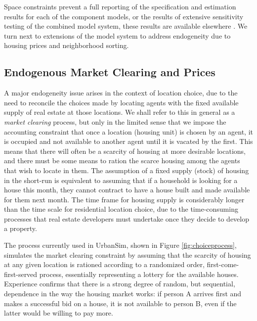 \documentclass[12pt,a4paper]{article}
\begin{document}
Space constraints prevent a full reporting of the specification and
estimation results for each of the component models, or the results
of extensive sensitivity testing of the combined model system, these
results are available elsewhere \cite{waddell-cuspa-2004}.  We turn
next to extensions of the model system to address endogeneity due to 
housing prices and neighborhood sorting.


\subsection{Endogenous Market Clearing and Prices}

A major endogeneity issue arises in the context of location
choice, due to the need to reconcile the choices made by locating
agents with the fixed available supply of real estate at those
locations. We shall refer to this in general as a \emph{market
clearing} process, but only in the limited sense that we impose
the accounting constraint that once a location (housing unit) is
chosen by an agent, it is occupied and not available to another
agent until it is vacated by the first.  This means that there
will often be a scarcity of housing at more desirable locations,
and there must be some means to ration the scarce housing among
the agents that wish to locate in them. The assumption of a fixed
supply (stock) of housing in the short-run is equivalent to
assuming that if a household is looking for a house this month,
they cannot contract to have a house built and made available for
them next month.  The time frame for housing supply is
considerably longer than the time scale for residential location
choice, due to the time-consuming processes that real estate
developers must undertake once they decide to develop a property.

The process currently used in UrbanSim, shown in Figure
\ref{fig:choiceprocess}, simulates the market clearing constraint
by assuming that the scarcity of housing at any given location is
rationed according to a randomized order, first-come-first-served
process, essentially representing a lottery for the available
houses. Experience confirms that there is a strong degree of
random, but sequential, dependence in the way the housing market
works: if person A arrives first and makes a successful bid on a
house, it is not available to person B, even if the latter would
be willing to pay more.
\end{document}
